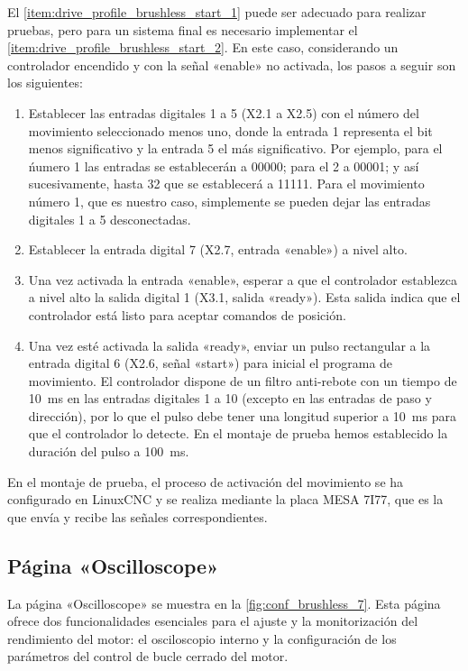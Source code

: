 \documentclass[english,spanish,a4paper,11pt]{article}
\begin{document}
El \cref{item:drive_profile_brushless_start_1} puede ser adecuado para realizar pruebas, pero para un sistema final es necesario implementar el \cref{item:drive_profile_brushless_start_2}. En este caso, considerando un controlador encendido y con la señal «enable» no activada, los pasos a seguir son los siguientes:
\begin{enumerate}
    \item Establecer las entradas digitales 1 a 5 (X2.1 a X2.5) con el número del movimiento seleccionado menos uno, donde la entrada 1 representa el bit menos significativo y la entrada 5 el más significativo. Por ejemplo, para el ńumero 1 las entradas se establecerán a 00000; para el 2 a 00001; y así sucesivamente, hasta 32 que se establecerá a 11111. Para el movimiento número 1, que es nuestro caso, simplemente se pueden dejar las entradas digitales 1 a 5 desconectadas.

    \item Establecer la entrada digital 7 (X2.7, entrada «enable») a nivel alto.

    \item Una vez activada la entrada «enable», esperar a que el controlador establezca a nivel alto la salida digital 1 (X3.1, salida «ready»). Esta salida indica que el controlador está listo para aceptar comandos de posición.

    \item Una vez esté activada la salida «ready», enviar un pulso rectangular a la entrada digital 6 (X2.6, señal «start») para inicial el programa de movimiento. El controlador dispone de un filtro anti-rebote con un tiempo de \qty{10}{\ms} en las entradas digitales 1 a 10 (excepto en las entradas de paso y dirección), por lo que el pulso debe tener una longitud superior a \qty{10}{\ms} para que el controlador lo detecte. En el montaje de prueba hemos establecido la duración del pulso a \qty{100}{\ms}.
\end{enumerate}

En el montaje de prueba, el proceso de activación del movimiento se ha configurado en LinuxCNC y se realiza mediante la placa MESA 7I77, que es la que envía y recibe las señales correspondientes.


\subsection{Página «Oscilloscope»}
\label{sec:page_oscilloscope}

La página «Oscilloscope» se muestra en la \cref{fig:conf_brushless_7}. Esta página ofrece dos funcionalidades esenciales para el ajuste y la monitorización del rendimiento del motor: el osciloscopio interno y la configuración de los parámetros del control de bucle cerrado del motor.
\end{document}
